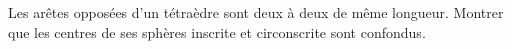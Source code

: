 Les arêtes opposées d'un tétraèdre sont deux à deux de même longueur. Montrer que les centres de ses sphères inscrite et circonscrite sont confondus.
